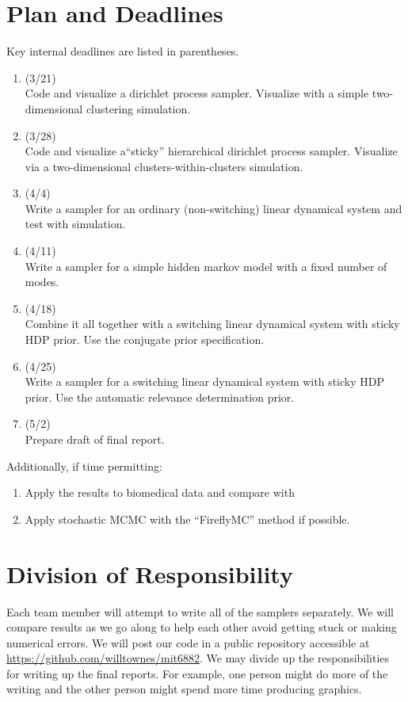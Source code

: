 \documentclass[12pt]{article}
\begin{document}
\section{Plan and Deadlines}
Key internal deadlines are listed in parentheses.
\begin{enumerate}
\item (3/21) \\Code and visualize a dirichlet process sampler. Visualize with a simple two-dimensional clustering simulation.
\item (3/28) \\Code and visualize a``sticky'' hierarchical dirichlet process sampler. Visualize via a two-dimensional clusters-within-clusters simulation.
\item (4/4) \\Write a sampler for an ordinary (non-switching) linear dynamical system and test with simulation.
\item (4/11) \\Write a sampler for a simple hidden markov model with a fixed number of modes.
\item (4/18) \\Combine it all together with a switching linear dynamical system with sticky HDP prior. Use the conjugate prior specification.
\item (4/25) \\Write a sampler for a switching linear dynamical system with sticky HDP prior. Use the automatic relevance determination prior.
\item (5/2) \\Prepare draft of final report.
\end{enumerate}
Additionally, if time permitting:
\begin{enumerate}
\item Apply the results to biomedical data and compare with \cite{lehman_physiological_2015}
\item Apply stochastic MCMC with the ``FireflyMC'' method \cite{maclaurin_firefly_2014} if possible.
\end{enumerate}

\section{Division of Responsibility}
Each team member will attempt to write all of the samplers separately. We will compare results as we go along to help each other avoid getting stuck or making numerical errors. We will post our code in a public repository accessible at \url{https://github.com/willtownes/mit6882}. We may divide up the responsibilities for writing up the final reports. For example, one person might do more of the writing and the other person might spend more time producing graphics.
\end{document}
